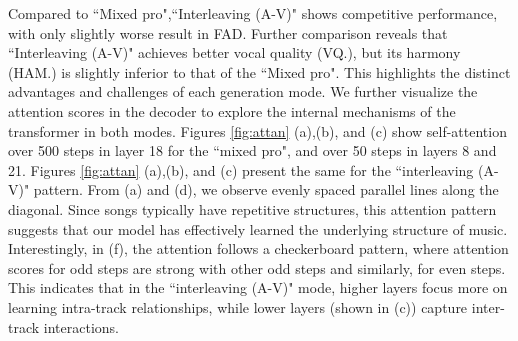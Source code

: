   

Compared to ``Mixed pro",``Interleaving (A-V)" shows competitive performance, with only slightly worse result in FAD. Further comparison reveals that ``Interleaving (A-V)" achieves better vocal quality (VQ.), but its harmony (HAM.) is slightly inferior to that of the ``Mixed pro". This highlights the distinct advantages and challenges of each generation mode. 
We further visualize the attention scores in the decoder to explore the internal mechanisms of the transformer in both modes. Figures \ref{fig:attan} (a),(b), and (c) show self-attention over 500 steps in layer 18 for the ``mixed pro", and over 50 steps in layers 8 and 21. Figures \ref{fig:attan} (a),(b), and (c) present the same for the ``interleaving (A-V)" pattern. From (a) and (d), we observe evenly spaced parallel lines along the diagonal. 
Since songs typically have repetitive structures, this attention pattern suggests that our model has effectively learned the underlying structure of music. Interestingly, in (f), the attention follows a checkerboard pattern, where attention scores for odd steps are strong with other odd steps and similarly, for even steps. This indicates that in the ``interleaving (A-V)" mode, higher layers focus more on learning intra-track relationships, while lower layers (shown in (c)) capture inter-track interactions.





